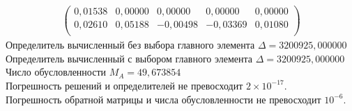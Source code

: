 \documentclass[a4paper,12pt,titlepage,finall]{article}
\begin{document}
\begin{enumerate}
\begin{align*}
\begin{pmatrix}
   0,01538&     0,00000&     0,00000&     0,00000&     0,00000 \\
   0,02610&     0,05188&    -0,00498&    -0,03369&     0,01080 \\
\end{pmatrix}
\end{align*}
Определитель вычисленный без выбора главного элемента  $\Delta = 3200925,000000$\\
Определитель вычисленный с выбором главного элемента $\Delta = 3200925,000000$\\
Число обусловленности $M_A = 49,673854$\\
Погрешность решений и определителей не превосходит $2 \times 10^{-17}$.\\
Погрешность обратной матрицы и числа обусловленности не превосходит $10^{-6}$.


\end{enumerate}
\end{document}
